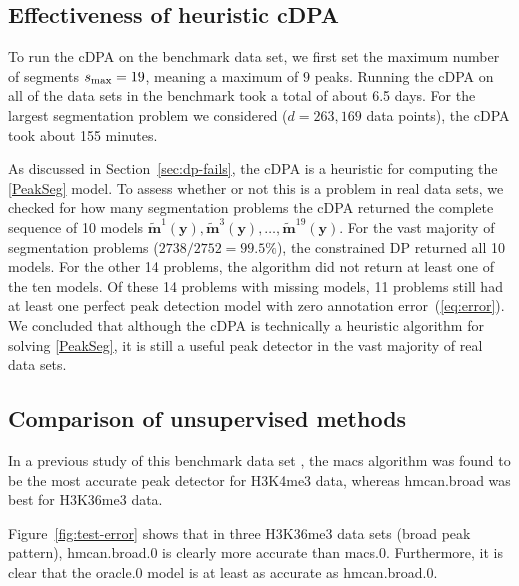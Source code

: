 \documentclass{article}
\begin{document}
\subsection{Effectiveness of heuristic cDPA}
\label{sec:heuristic-effectiveness}

To run the cDPA on the benchmark data set, we first set the maximum
number of segments $s_{\text{\text{max}}}=19$, meaning a maximum of $9$
peaks. 
Running the cDPA on all of the data sets in the benchmark took
a total of about 6.5 days. For the largest segmentation problem we considered
($d=263,169$ data points), the cDPA took
about 155 minutes. 

As discussed in Section~\ref{sec:dp-fails}, the cDPA is a heuristic
for computing the \ref{PeakSeg} model. To assess whether or not this
is a problem in real data sets, we checked for how many segmentation
problems the cDPA returned the complete sequence of 10 models
$\mathbf{\tilde m}^1(\mathbf y),\mathbf{\tilde m}^3(\mathbf y), \dots,
\mathbf{\tilde m}^{19}(\mathbf y)$. For the vast majority of
segmentation problems ($2738/2752=99.5\%$), the constrained DP returned
all 10 models. For the other 14 problems, the algorithm did not return
at least one of the ten models. Of these 14 problems with missing
models, 11 problems still had at least one perfect peak detection
model with zero annotation error~(\ref{eq:error}). We concluded that
although the cDPA is technically a heuristic algorithm for
solving \ref{PeakSeg}, it is still a useful peak detector in the vast
majority of real data sets.



\subsection{Comparison of unsupervised methods}

In a previous study of this benchmark data set
\citep{hocking2014visual}, the macs algorithm was found to be the most
accurate peak detector for H3K4me3 data, whereas hmcan.broad was best
for H3K36me3 data.

Figure~\ref{fig:test-error} shows that in three H3K36me3 data sets
(broad peak pattern), hmcan.broad.0 is clearly more accurate than
macs.0. Furthermore, it is clear that the oracle.0 model is at least
as accurate as hmcan.broad.0.
\end{document}
